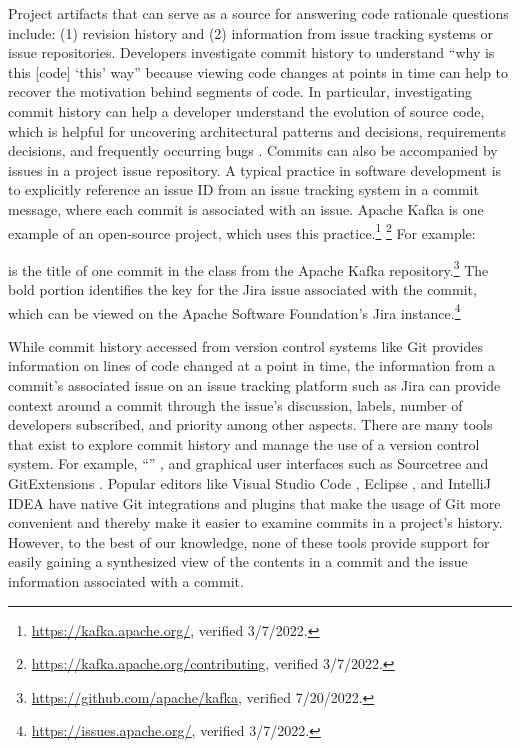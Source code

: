 Project artifacts that can serve as a source for answering code rationale questions include: 
(1) revision history and (2) information from issue tracking systems or issue repositories. 
Developers investigate commit history to understand ``why is this [code] ‘this’ way'' because 
viewing code changes at points in time can help to recover the motivation behind segments of code.
In particular, investigating commit history can help a developer understand the evolution of source code, 
which is helpful for uncovering architectural patterns and decisions, requirements decisions, 
and frequently occurring bugs \cite{codoban_software_2015}.
Commits can also be accompanied by issues in a project issue repository. 
A typical practice in software development is to explicitly reference an issue ID from an issue tracking system 
in a commit message, where each commit is associated with an issue. 
Apache Kafka is one example of an open-source project, which uses this practice.\footnote{\url{https://kafka.apache.org/}, verified 3/7/2022.} \footnote{\url{https://kafka.apache.org/contributing}, verified 3/7/2022.}
For example: 

\begin{center}
\end{center}

\noindent is the title of one commit in the  class from the Apache Kafka repository.\footnote{\url{https://github.com/apache/kafka}, verified 7/20/2022.}
The bold portion identifies the key for the Jira issue associated with the commit, 
which can be viewed on the Apache Software Foundation's Jira instance.\footnote{\url{https://issues.apache.org/}, verified 3/7/2022.}

While commit history accessed from version control systems like Git provides information on lines of code changed at a point in time, 
the information from a commit's associated issue on an issue tracking platform 
such as Jira \cite{jira} can provide context around a commit through the issue's discussion, labels, 
number of developers subscribed, and priority among other aspects.
There are many tools that exist to explore commit history and manage the use of a version control system. 
For example, ``'' \cite{gitblame}, and graphical user interfaces such as Sourcetree \cite{sourcetree} and GitExtensions \cite{gitextensions}. 
Popular editors like Visual Studio Code \cite{vscode}, Eclipse \cite{eclipse}, and IntelliJ IDEA \cite{intellij} have native Git integrations and plugins that make the usage of Git more convenient and thereby make it easier to examine commits in a project's history. 
However, to the best of our knowledge, none of these tools provide support for easily gaining a synthesized view of the contents in a commit and the issue information associated with a commit.

